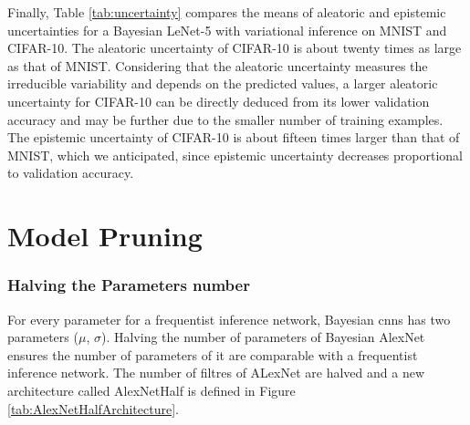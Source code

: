 \newline Finally, Table \ref{tab:uncertainty} compares the means of aleatoric and epistemic uncertainties for a Bayesian LeNet-5 with variational inference on MNIST and CIFAR-10. The aleatoric uncertainty of CIFAR-10 is about twenty times as large as that of MNIST. Considering that the aleatoric uncertainty measures the irreducible variability and depends on the predicted values, a larger aleatoric uncertainty for CIFAR-10 can be directly deduced from its lower validation accuracy and may be further due to the smaller number of training examples. The epistemic uncertainty of CIFAR-10 is about fifteen times larger than that of MNIST, which we anticipated, since epistemic uncertainty decreases proportional to validation accuracy. 
\begin{table}[t!]
\tiny
    \centering
    \renewcommand{\arraystretch}{1.5}
    \renewcommand{\arraystretch}{1.5}
    \caption{Aleatoric and epistemic uncertainty for Bayesian LeNet-5 calculated for MNIST and CIFAR-10, computed as proposed by Kwon et al. \cite{kwon2018uncertainty}.}
    \label{tab:uncertainty}
\end{table}

\section{Model Pruning}

\subsubsection{Halving the Parameters number}

For every parameter for a frequentist inference network, Bayesian \acp{cnn} has two parameters ($\mu$, $\sigma$). Halving the number of parameters of Bayesian AlexNet ensures the number of parameters of it are comparable with a frequentist inference network. The number of filtres of ALexNet are halved and a new architecture called AlexNetHalf is defined in Figure \ref{tab:AlexNetHalfArchitecture}. 

